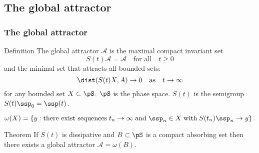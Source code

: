 \subsection{The global attractor}

\begin{frame}[shrink]%
  \frametitle{The global attractor}

  \begin{block}{Definition}
    The global attractor $\mathcal{A}$ is
    the maximal compact invariant set
    \begin{equation}
      S(t)\mathcal{A} = \mathcal{A} \quad \text{for all} \quad
      t \ge 0
      \label{eq:ga1}
    \end{equation}
    and the minimal set that attracts all bounded sets:
    \begin{equation}
      \dist(S(t)X, A) \to 0 \quad \text{as} \quad t\to\infty
      \label{eq:ga2}
    \end{equation}
    for any bounded set $X\subset \pS$. $\pS$ is the phase space.
    $S(t)$ is the semigroup $S(t)\ssp_0 = \ssp(t)$.
  \end{block}

  \pause

  \[
    \omega(X) = \{y :
    \text{there exist sequences}\; t_n\to\infty\;\text{and}\; \ssp_n\in X \;
    \text{with}\; S(t_n)\ssp_n\to y\}
    \,.
  \]
  \begin{block}{Theorem}
    If $S(t)$ is dissipative and $B\subset \pS$ is a compact absorbing
    set then there exists a global attractor $\mathcal{A} = \omega(B)$.
  \end{block}

\end{frame}


